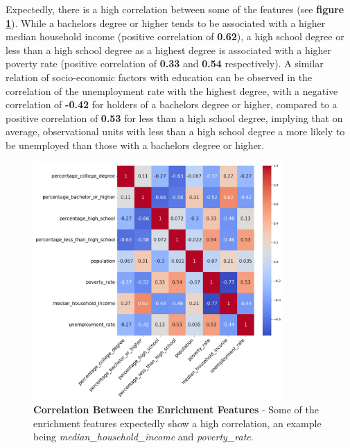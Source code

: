 Expectedly, there is a high correlation between some of the features (see \textbf{figure \ref{fig:CH03_Enrichment_Correlation}}).
While a bachelors degree or higher tends to be associated with a higher median household income (positive correlation of \textbf{0.62}), a high school degree or less than a high school degree as a highest degree is associated with a higher poverty rate (positive correlation of \textbf{0.33} and \textbf{0.54} respectively).
A similar relation of socio-economic factors with education can be observed in the correlation of the unemployment rate with the highest degree, with a negative correlation of \textbf{-0.42} for holders of a bachelors degree or higher, compared to a positive correlation of \textbf{0.53} for less than a high school degree, implying that on average, observational units with less than a high school degree a more likely to be unemployed than those with a bachelors degree or higher.

\begin{figure}[h]
    \centering
    \includegraphics[width=0.85\textwidth]{images/CH03_Enrichment_Correlation.png}
    \caption[Correlation Between the Enrichment Features]{\textbf{Correlation Between the Enrichment Features} - Some of the enrichment features expectedly show a high correlation, an example being \textit{median\_household\_income} and \textit{poverty\_rate}.}
    \label{fig:CH03_Enrichment_Correlation}
\end{figure}

